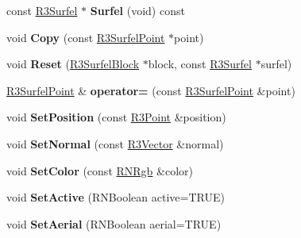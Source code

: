 \begin{DoxyCompactItemize}
\item 
const \hyperlink{class_r3_surfel}{R3\+Surfel} $\ast$ {\bfseries Surfel} (void) const \hypertarget{class_r3_surfel_point_ad6dd9e18d3b9184e8011db7333875e35}{}\label{class_r3_surfel_point_ad6dd9e18d3b9184e8011db7333875e35}

\item 
void {\bfseries Copy} (const \hyperlink{class_r3_surfel_point}{R3\+Surfel\+Point} $\ast$point)\hypertarget{class_r3_surfel_point_a73f2fda7d424c47f6a4b4bb9b0f686d0}{}\label{class_r3_surfel_point_a73f2fda7d424c47f6a4b4bb9b0f686d0}

\item 
void {\bfseries Reset} (\hyperlink{class_r3_surfel_block}{R3\+Surfel\+Block} $\ast$block, const \hyperlink{class_r3_surfel}{R3\+Surfel} $\ast$surfel)\hypertarget{class_r3_surfel_point_a591509bd50199800a0dc5c9ed11ae934}{}\label{class_r3_surfel_point_a591509bd50199800a0dc5c9ed11ae934}

\item 
\hyperlink{class_r3_surfel_point}{R3\+Surfel\+Point} \& {\bfseries operator=} (const \hyperlink{class_r3_surfel_point}{R3\+Surfel\+Point} \&point)\hypertarget{class_r3_surfel_point_a7587940b081c0fa2fd4a953af9aa8687}{}\label{class_r3_surfel_point_a7587940b081c0fa2fd4a953af9aa8687}

\item 
void {\bfseries Set\+Position} (const \hyperlink{class_r3_point}{R3\+Point} \&position)\hypertarget{class_r3_surfel_point_af35ccf9413aa3c406cb32f75aff99af0}{}\label{class_r3_surfel_point_af35ccf9413aa3c406cb32f75aff99af0}

\item 
void {\bfseries Set\+Normal} (const \hyperlink{class_r3_vector}{R3\+Vector} \&normal)\hypertarget{class_r3_surfel_point_a6bb15c7fed5e8b240dd533be1db1dcb1}{}\label{class_r3_surfel_point_a6bb15c7fed5e8b240dd533be1db1dcb1}

\item 
void {\bfseries Set\+Color} (const \hyperlink{class_r_n_rgb}{R\+N\+Rgb} \&color)\hypertarget{class_r3_surfel_point_ab879f615a74a968fe305f6a7e50ecc8d}{}\label{class_r3_surfel_point_ab879f615a74a968fe305f6a7e50ecc8d}

\item 
void {\bfseries Set\+Active} (R\+N\+Boolean active=T\+R\+UE)\hypertarget{class_r3_surfel_point_acb660e9f47be931fbd114592b0a23d22}{}\label{class_r3_surfel_point_acb660e9f47be931fbd114592b0a23d22}

\item 
void {\bfseries Set\+Aerial} (R\+N\+Boolean aerial=T\+R\+UE)\hypertarget{class_r3_surfel_point_a1a4d1e8b101991e0a7768f1d39cffb38}{}\label{class_r3_surfel_point_a1a4d1e8b101991e0a7768f1d39cffb38}


\end{DoxyCompactItemize}
